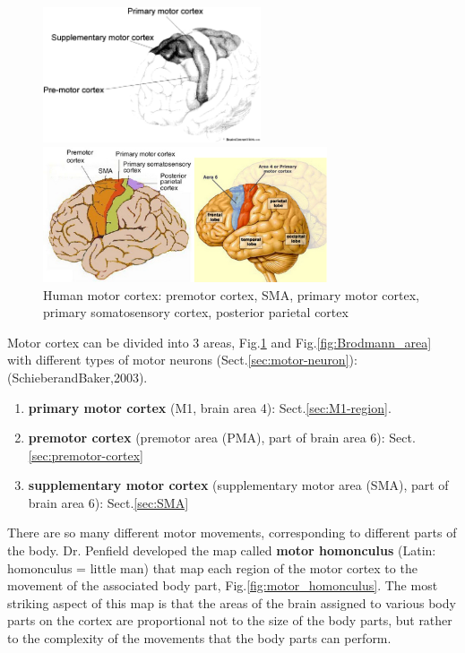 \begin{figure}[hbt]
  \centerline{
  \includegraphics[height=4cm,
    angle=0]{./images/motor-cortex.eps}}
  \centerline{
  \includegraphics[height=4cm,
    angle=0]{./images/motor_cortex.eps}}
\caption{Human motor cortex: premotor cortex, SMA, primary motor cortex,
primary somatosensory cortex, posterior parietal cortex}
\label{fig:motor_cortex}
\end{figure}

Motor cortex can be divided into 3 areas, Fig.\ref{fig:motor_cortex} and
Fig.\ref{fig:Brodmann_area} with different types of motor neurons
(Sect.\ref{sec:motor-neuron}): (SchieberandBaker,2003).
\begin{enumerate}
  \item {\bf primary motor cortex} (M1, brain area 4):
  Sect.\ref{sec:M1-region}.

  
   \item {\bf premotor cortex} (premotor area (PMA), part of brain area 6):
   Sect.\ref{sec:premotor-cortex}
  
  \item {\bf supplementary motor cortex} (supplementary motor area (SMA), part
  of brain area 6): Sect.\ref{sec:SMA}
\end{enumerate}


There are so many different motor movements, corresponding to different parts of
the body. Dr. Penfield developed the map called {\bf motor homonculus} (Latin:
homonculus = little man) that map each region of the motor cortex to the
movement of the associated body part, Fig.\ref{fig:motor_homonculus}.
The most striking aspect of this map is that the areas of the brain assigned to
various body parts on the cortex are proportional not to the size of the body
parts, but rather to the  complexity of the movements that the body parts can
perform.

